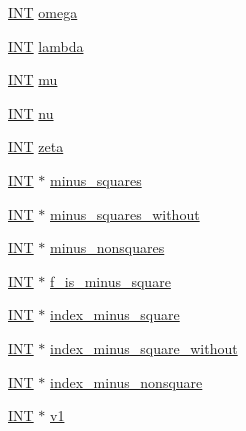 \begin{DoxyCompactItemize}
\item 
\mbox{\hyperlink{galois_8h_a09fddde158a3a20bd2dcadb609de11dc}{I\+NT}} \mbox{\hyperlink{classorthogonal_a14b827521ee8a9b84cdf73109a0e5540}{omega}}
\item 
\mbox{\hyperlink{galois_8h_a09fddde158a3a20bd2dcadb609de11dc}{I\+NT}} \mbox{\hyperlink{classorthogonal_acb5f1677783587b99e27312f8af18086}{lambda}}
\item 
\mbox{\hyperlink{galois_8h_a09fddde158a3a20bd2dcadb609de11dc}{I\+NT}} \mbox{\hyperlink{classorthogonal_a074334df90f035930c7190f79bed794f}{mu}}
\item 
\mbox{\hyperlink{galois_8h_a09fddde158a3a20bd2dcadb609de11dc}{I\+NT}} \mbox{\hyperlink{classorthogonal_a9fe9656b6e027b9ed7455cf7ef7b3d64}{nu}}
\item 
\mbox{\hyperlink{galois_8h_a09fddde158a3a20bd2dcadb609de11dc}{I\+NT}} \mbox{\hyperlink{classorthogonal_a14eb8a43b9ab0c0226650f753ab8ead8}{zeta}}
\item 
\mbox{\hyperlink{galois_8h_a09fddde158a3a20bd2dcadb609de11dc}{I\+NT}} $\ast$ \mbox{\hyperlink{classorthogonal_a720a7487b4c1f9bf41c13ac7885dca00}{minus\+\_\+squares}}
\item 
\mbox{\hyperlink{galois_8h_a09fddde158a3a20bd2dcadb609de11dc}{I\+NT}} $\ast$ \mbox{\hyperlink{classorthogonal_a35e0a33a2f39989d5b6f89b7bdaa1fff}{minus\+\_\+squares\+\_\+without}}
\item 
\mbox{\hyperlink{galois_8h_a09fddde158a3a20bd2dcadb609de11dc}{I\+NT}} $\ast$ \mbox{\hyperlink{classorthogonal_a4b1f115228e2e3e23024c09ade44ce46}{minus\+\_\+nonsquares}}
\item 
\mbox{\hyperlink{galois_8h_a09fddde158a3a20bd2dcadb609de11dc}{I\+NT}} $\ast$ \mbox{\hyperlink{classorthogonal_a1d95b29dff19c5f1cc98e518a4c56d14}{f\+\_\+is\+\_\+minus\+\_\+square}}
\item 
\mbox{\hyperlink{galois_8h_a09fddde158a3a20bd2dcadb609de11dc}{I\+NT}} $\ast$ \mbox{\hyperlink{classorthogonal_a018882b7fcf2ae22aa33a153a884c77c}{index\+\_\+minus\+\_\+square}}
\item 
\mbox{\hyperlink{galois_8h_a09fddde158a3a20bd2dcadb609de11dc}{I\+NT}} $\ast$ \mbox{\hyperlink{classorthogonal_a53c486c46e0c9871ba8ee3175b7767be}{index\+\_\+minus\+\_\+square\+\_\+without}}
\item 
\mbox{\hyperlink{galois_8h_a09fddde158a3a20bd2dcadb609de11dc}{I\+NT}} $\ast$ \mbox{\hyperlink{classorthogonal_a3c4daace5db72ba0f07a17a15355ecfe}{index\+\_\+minus\+\_\+nonsquare}}
\item 
\mbox{\hyperlink{galois_8h_a09fddde158a3a20bd2dcadb609de11dc}{I\+NT}} $\ast$ \mbox{\hyperlink{classorthogonal_ac83d3c532cfb792b5bca01e38aa3aa53}{v1}}

\end{DoxyCompactItemize}
